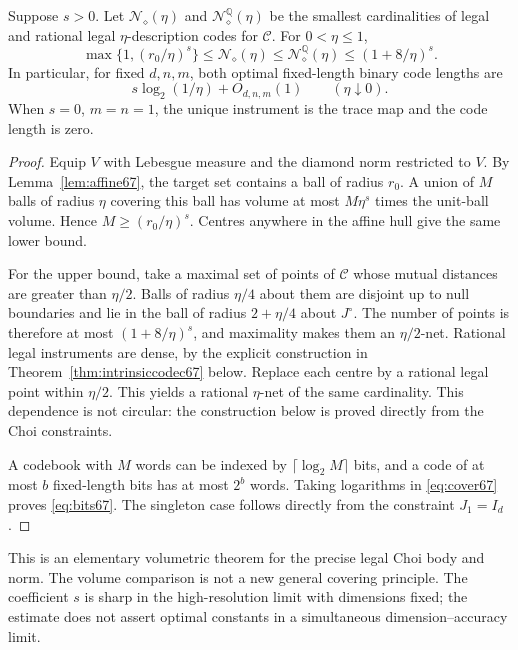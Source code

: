 \begin{theorem}\label{thm:entropy67}
Suppose $s>0$. Let $\mathcal N_{\diamond}(\eta)$ and
$\mathcal N^{\mathbb Q}_{\diamond}(\eta)$ be the smallest cardinalities
of legal and rational legal $\eta$-description codes for $\mathcal C$.
For $0<\eta\le1$,
\begin{equation}\label{eq:cover67}
 \max\{1,(r_0/\eta)^s\}
 \le\mathcal N_{\diamond}(\eta)
 \le\mathcal N^{\mathbb Q}_{\diamond}(\eta)
 \le(1+8/\eta)^s.
\end{equation}
In particular, for fixed $d,n,m$, both optimal fixed-length binary
code lengths are
\begin{equation}\label{eq:bits67}
 s\log_2(1/\eta)+O_{d,n,m}(1)\qquad(\eta\downarrow0).
\end{equation}
When $s=0$, $m=n=1$, the unique instrument is the trace map and the
code length is zero.
\end{theorem}
\begin{proof}
Equip $V$ with Lebesgue measure and the diamond norm restricted to $V$.
By Lemma~\ref{lem:affine67}, the target set contains a ball of radius
$r_0$. A union of $M$ balls of radius $\eta$ covering this ball has
volume at most $M\eta^s$ times the unit-ball volume. Hence
$M\ge(r_0/\eta)^s$. Centres anywhere in the affine hull give the same
lower bound.

For the upper bound, take a maximal set of points of $\mathcal C$
whose mutual distances are greater than $\eta/2$. Balls of radius
$\eta/4$ about them are disjoint up to null boundaries and lie in the
ball of radius $2+\eta/4$ about $J^\circ$. The number of points is
therefore at most $(1+8/\eta)^s$, and maximality makes them an
$\eta/2$-net. Rational legal instruments are dense, by the explicit
construction in Theorem~\ref{thm:intrinsiccodec67} below. Replace each
centre by a rational legal point within $\eta/2$. This yields a rational
$\eta$-net of the same cardinality. This dependence is not circular:
the construction below is proved directly from the Choi constraints.

A codebook with $M$ words can be indexed by $\lceil\log_2M\rceil$ bits,
and a code of at most $b$ fixed-length bits has at most $2^b$ words.
Taking logarithms in \eqref{eq:cover67} proves \eqref{eq:bits67}.
The singleton case follows directly from the constraint $J_1=I_d$.
\end{proof}
This is an elementary volumetric theorem for the precise legal Choi
body and norm. The volume comparison is not a new general covering
principle. The coefficient $s$ is sharp in the high-resolution limit
with dimensions fixed; the estimate does not assert optimal constants
in a simultaneous dimension--accuracy limit.

